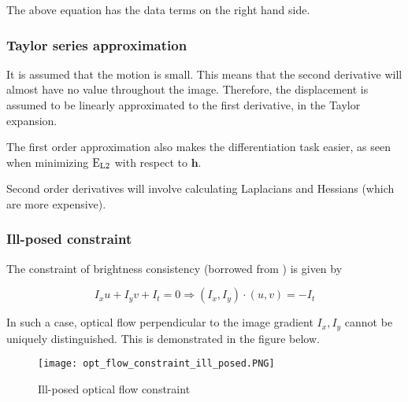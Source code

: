 The above equation has the data terms on the right hand side.

\subsubsection{Taylor series approximation}

It is assumed that the motion is small. This means that the second derivative will almost have no value throughout the image. Therefore, the displacement is assumed to be linearly approximated to the first derivative, in the Taylor expansion.

The first order approximation also makes the differentiation task easier, as seen when minimizing $\textup{E}_{\textup{L2}}$ with respect to $\mathbf{h}$.

Second order derivatives will involve calculating Laplacians and Hessians (which are more expensive).

\subsubsection{Ill-posed constraint}

The constraint of brightness consistency (borrowed from \cite{horn1981determining}) is given by

\begin{equation}
    I_x u + I_y v + I_t = 0 \Rightarrow \left ( I_x, I_y \right ) \cdot \left ( u, v \right ) = -I_t
\end{equation}

In such a case, optical flow perpendicular to the image gradient $I_x, I_y$ cannot be uniquely distinguished. This is demonstrated in the figure below.

\begin{figure}[h]
    \centering
    \texttt{[image: opt\_flow\_constraint\_ill\_posed.PNG]}
    \caption{Ill-posed optical flow constraint}
\end{figure}
